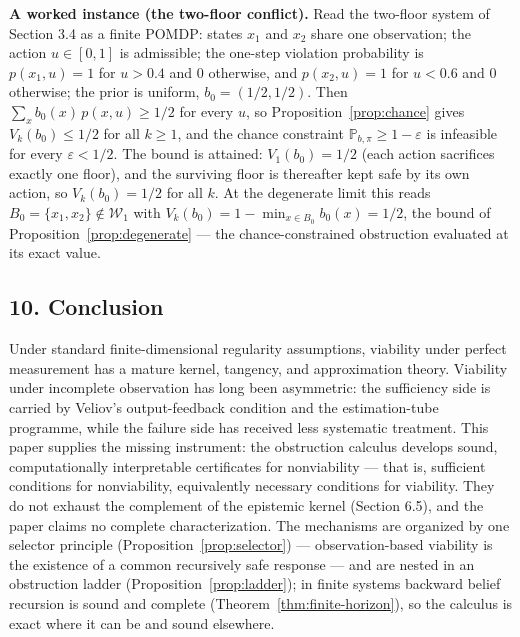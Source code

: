\documentclass[10pt,twocolumn]{article}
\theoremstyle{definition}
\begin{document}
\textbf{A worked instance (the two-floor conflict).} Read the two-floor system of Section 3.4 as a finite POMDP: states \(x_{1}\) and \(x_{2}\) share one observation; the action \(u \in [0,1]\) is admissible; the one-step violation probability is \(p(x_{1}, u) = 1\) for \(u > 0.4\) and \(0\) otherwise, and \(p(x_{2}, u) = 1\) for \(u < 0.6\) and \(0\) otherwise; the prior is uniform, \(b_{0} = (1/2, 1/2)\). Then \(\sum_{x} b_{0}(x)\, p(x, u) \ge 1/2\) for every \(u\), so Proposition~\ref{prop:chance} gives \(V_{k}(b_{0}) \le 1/2\) for all \(k \ge 1\), and the chance constraint \(\mathbb{P}_{b,\pi} \ge 1 - \varepsilon\) is infeasible for every \(\varepsilon < 1/2\). The bound is attained: \(V_{1}(b_{0}) = 1/2\) (each action sacrifices exactly one floor), and the surviving floor is thereafter kept safe by its own action, so \(V_{k}(b_{0}) = 1/2\) for all \(k\). At the degenerate limit this reads \(B_{0} = \{x_{1}, x_{2}\} \notin \mathcal{W}_{1}\) with \(V_{k}(b_{0}) = 1 - \min_{x \in B_{0}} b_{0}(x) = 1/2\), the bound of Proposition~\ref{prop:degenerate} --- the chance-constrained obstruction evaluated at its exact value.

\subsection{10. Conclusion}\label{conclusion}

Under standard finite-dimensional regularity assumptions, viability under perfect measurement has a mature kernel, tangency, and approximation theory. Viability under incomplete observation has
long been asymmetric: the sufficiency side is carried by Veliov's
output-feedback condition and the estimation-tube programme, while the failure side has received less systematic treatment. This paper supplies the missing instrument: the obstruction calculus develops sound, computationally interpretable certificates for nonviability --- that is, sufficient conditions for nonviability, equivalently necessary conditions for viability. They do not exhaust the complement of the epistemic kernel (Section 6.5), and the paper claims no complete characterization. The mechanisms
are organized by one selector principle (Proposition~\ref{prop:selector}) --- observation-based viability
is the existence of a common recursively safe response --- and are
nested in an obstruction ladder (Proposition~\ref{prop:ladder}); in
finite systems backward belief recursion is sound and complete
(Theorem~\ref{thm:finite-horizon}), so the calculus is exact where it
can be and sound elsewhere.
\end{document}
